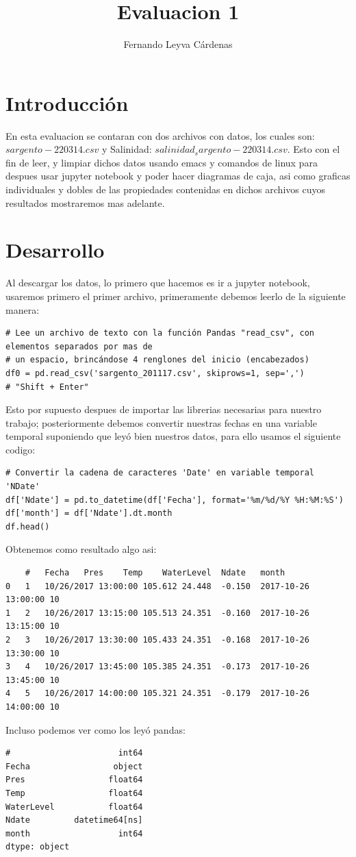\documentclass{article}
\title{Evaluacion 1}
\author{Fernando Leyva Cárdenas}
\begin{document}
\maketitle

\section{Introducción}
En esta evaluacion se contaran con dos archivos con datos, los cuales son: $sargento-220314.csv$ y Salinidad: $salinidad_sargento-220314.csv$. Esto con el fin de leer, y limpiar dichos datos usando emacs y comandos de linux para despues usar jupyter notebook y poder hacer diagramas de caja, asi como graficas individuales y dobles de las propiedades contenidas en dichos archivos cuyos resultados mostraremos mas adelante.

\section{Desarrollo}
Al descargar los datos, lo primero que hacemos es ir a jupyter notebook, usaremos primero el primer archivo, primeramente debemos leerlo de la siguiente manera:

\begin{verbatim}
# Lee un archivo de texto con la función Pandas "read_csv", con elementos separados por mas de 
# un espacio, brincándose 4 renglones del inicio (encabezados)
df0 = pd.read_csv('sargento_201117.csv', skiprows=1, sep=',')
# "Shift + Enter"
\end{verbatim}
Esto por supuesto despues de importar las librerias necesarias para nuestro trabajo; posteriormente debemos convertir nuestras fechas en una variable temporal suponiendo que leyó bien nuestros datos, para ello usamos el siguiente codigo:

\begin{verbatim}
# Convertir la cadena de caracteres 'Date' en variable temporal 'NDate'
df['Ndate'] = pd.to_datetime(df['Fecha'], format='%m/%d/%Y %H:%M:%S')
df['month'] = df['Ndate'].dt.month
df.head()
\end{verbatim}
Obtenemos como resultado algo asi:

\begin{verbatim}
	#	Fecha	Pres	Temp	WaterLevel	Ndate	month
0	1	10/26/2017 13:00:00	105.612	24.448	-0.150	2017-10-26 13:00:00	10
1	2	10/26/2017 13:15:00	105.513	24.351	-0.160	2017-10-26 13:15:00	10
2	3	10/26/2017 13:30:00	105.433	24.351	-0.168	2017-10-26 13:30:00	10
3	4	10/26/2017 13:45:00	105.385	24.351	-0.173	2017-10-26 13:45:00	10
4	5	10/26/2017 14:00:00	105.321	24.351	-0.179	2017-10-26 14:00:00	10
\end{verbatim}
Incluso podemos ver como los leyó pandas:
\begin{verbatim}
#                      int64
Fecha                 object
Pres                 float64
Temp                 float64
WaterLevel           float64
Ndate         datetime64[ns]
month                  int64
dtype: object
\end{verbatim}
\end{document}
